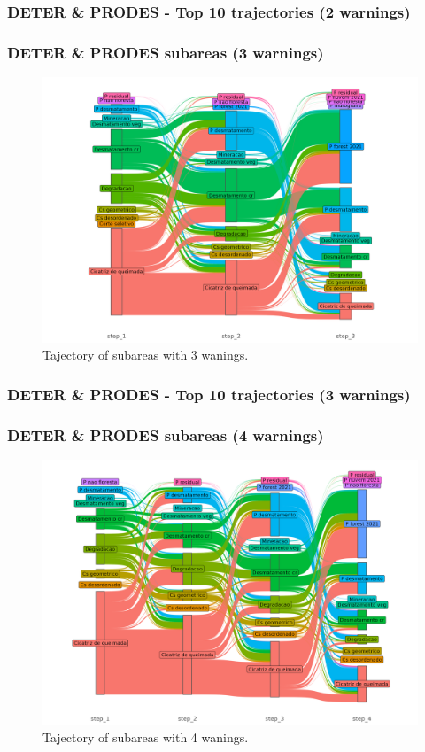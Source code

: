 \documentclass[aspectratio=169]{beamer}
\begin{document}
\begin{frame}[allowframebreaks]
    \frametitle{DETER \& PRODES - Top 10 trajectories (2 warnings)}
    
\end{frame}

\begin{frame}
    \frametitle{DETER \& PRODES subareas (3 warnings)}
    \begin{figure}[h] 
        \includegraphics[width=0.65\linewidth]
        {./figures/plot_deter_prodes_subarea_trajectory_3.png}
        \caption{Tajectory of subareas with 3 wanings.}
        \label{fig:deter_prodes_subarea_trajectory_3}
    \end{figure}
\end{frame}

\begin{frame}[allowframebreaks]
    \frametitle{DETER \& PRODES - Top 10 trajectories (3 warnings)}
    
\end{frame}

\begin{frame}
    \frametitle{DETER \& PRODES subareas (4 warnings)}
    \begin{figure}[h] 
        \includegraphics[width=0.65\linewidth]
        {./figures/plot_deter_prodes_subarea_trajectory_4.png}
        \caption{Tajectory of subareas with 4 wanings.}
        \label{fig:deter_prodes_subarea_trajectory_4}
    \end{figure}
\end{frame}
\end{document}
